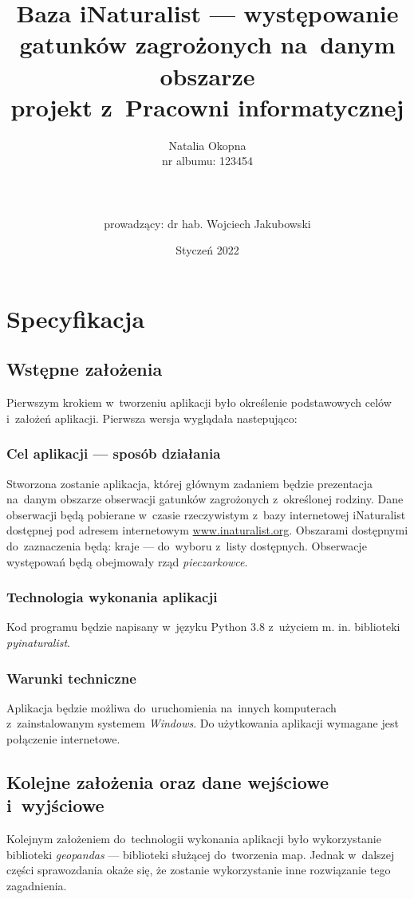 \documentclass{article}
\title{Baza iNaturalist --- występowanie gatunków zagrożonych na~danym obszarze\\ \large{projekt z~Pracowni informatycznej}}
\author{Natalia Okopna \\nr albumu: 123454\\\\\\\\ prowadzący: dr hab. Wojciech Jakubowski}
\date{Styczeń 2022}
\begin{document}
\maketitle
\newpage
\tableofcontents
\newpage

\section{Specyfikacja}
\subsection{Wstępne założenia}
Pierwszym krokiem w~tworzeniu aplikacji było określenie podstawowych celów i~założeń aplikacji. Pierwsza wersja wyglądała nastepująco:

\subsubsection{Cel aplikacji — sposób działania}
Stworzona zostanie aplikacja, której głównym zadaniem będzie prezentacja na~danym obszarze obserwacji gatunków zagrożonych z~określonej rodziny. Dane obserwacji będą pobierane w~czasie rzeczywistym z~bazy internetowej iNaturalist dostępnej pod adresem internetowym \url{www.inaturalist.org}. Obszarami dostępnymi do~zaznaczenia będą: kraje --- do~wyboru z~listy dostępnych. Obserwacje występowań będą obejmowały rząd \textit{pieczarkowce}.

\subsubsection{Technologia wykonania aplikacji}
Kod programu będzie napisany w~języku Python 3.8 z~użyciem m. in. biblioteki \textit{pyinaturalist}.

\subsubsection{Warunki techniczne}

Aplikacja będzie możliwa do~uruchomienia na~innych komputerach z~zainstalowanym systemem \textit{Windows}. Do użytkowania aplikacji wymagane jest połączenie internetowe.

\subsection{Kolejne założenia oraz dane wejściowe i~wyjściowe}

Kolejnym założeniem do~technologii wykonania aplikacji było wykorzystanie biblioteki \textit{geopandas} --- biblioteki służącej do~tworzenia map. Jednak w~dalszej części sprawozdania okaże się, że zostanie wykorzystanie inne rozwiązanie tego zagadnienia.
\end{document}
